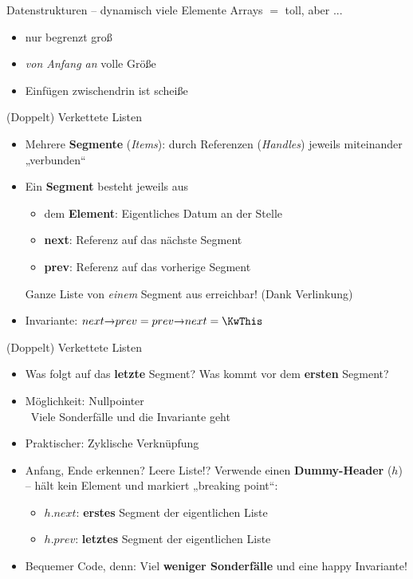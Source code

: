 \begin{frame}{{\vspace{5pt}Datenstrukturen – dynamisch viele Elemente}}
	Arrays $=$ toll, aber ...
		\pause
		\begin{itemize}
			\item[\Cons] nur begrenzt groß
			\pause
			\item[\Cons] \emph{von Anfang an} volle Größe
			\pause
			\item[\Cons] Einfügen zwischendrin ist scheiße
		\end{itemize}
\end{frame}

\begin{frame}{(Doppelt) Verkettete Listen}
	\begin{itemize}
		\item Mehrere \textbf{Segmente} (\emph{Items}): durch Referenzen  (\emph{Handles}) jeweils miteinander „verbunden“
		\pause
		\item Ein \textbf{Segment} besteht jeweils aus
		\begin{itemize}
			\item dem \textbf{Element}: Eigentliches Datum an der Stelle
			\pause
			\item \textbf{next}: Referenz auf das nächste Segment
			\pause
			\item \textbf{prev}: Referenz auf das vorherige Segment
		\end{itemize}
		\pause
		\implitem Ganze Liste von \textit{einem} Segment aus erreichbar! (Dank Verlinkung)
		\pause 
		\item Invariante: $next \access prev = prev \access next = \KwThis$
	\end{itemize}
\end{frame}

\begin{frame}{(Doppelt) Verkettete Listen}
	\begin{itemize}
		\item Was folgt auf das \textbf{letzte} Segment? Was kommt vor dem \textbf{ersten} Segment?
		\pause
		\item Möglichkeit: Nullpointer \\
		\pause
		\hanging \Cons \ Viele Sonderfälle und die Invariante geht  \frownie
		\pause
		\item Praktischer: Zyklische Verknüpfung
		\pause
		\item Anfang, Ende erkennen? Leere Liste!?
		\pause
		\implitem Verwende einen \textbf{Dummy-Header} ($h$) – hält kein Element und markiert „breaking point“:
		\pause
		\begin{itemize}
			\item $h.next$: \textbf{erstes} Segment der eigentlichen Liste
			\item $h.prev$: \textbf{letztes} Segment der eigentlichen Liste
		\end{itemize}
		\pause
		\item[\Pros] Bequemer Code, denn: Viel \textbf{weniger Sonderfälle} und eine happy Invariante! \smiley
	\end{itemize}
\end{frame}

